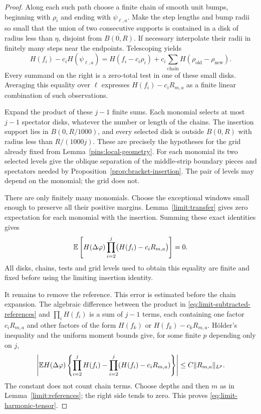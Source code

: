 \begin{proof}
Along each such path choose a finite chain of smooth unit bumps,
beginning with \(\rho_i\) and ending with \(\psi_{\ell,a}\).
Make the step lengths and bump radii so small that the union of
two consecutive supports is contained in a disk of radius less
than \(\eta\), disjoint from \(\overline{B(0,R)}\).
If necessary interpolate their radii in finitely many steps near
the endpoints.  Telescoping yields
\[
 H(f_i)-c_iH(\psi_{\ell,a})
  =H(f_i-c_i\rho_i)
    +c_i\sum_{\text{chain}}H(\rho_{\mathrm{old}}-\rho_{\mathrm{new}}).
\]
Every summand on the right is a zero-total test in one of these
small disks.  Averaging this equality over \(\ell\) expresses
\(H(f_i)-c_iR_{m,a}\) as a finite linear combination of such
observations.

Expand the product of these \(j-1\) finite sums.  Each monomial
selects at most \(j-1\) spectator disks, whatever the number or
length of the chains.  The insertion support lies in
\(B(0,R/1000)\), and every selected disk is outside \(B(0,R)\)
with radius less than \(R/(1000j)\).  These are precisely the
hypotheses for the grid already fixed from
Lemma~\ref{pins:local-geometry}.  For each monomial its two selected
levels give the oblique separation of the middle-strip boundary
pieces and spectators needed by Proposition~\ref{prop:bracket-insertion}.
The pair of levels may depend on the monomial; the grid does not.

There are only finitely many monomials.  Choose the exceptional windows
small enough to preserve all their positive margins.
Lemma~\ref{limit:transfer} gives zero expectation for each monomial
with the insertion.  Summing these exact identities gives
\begin{equation}
 \mathbb E\left[H(\Delta\varphi)
              \prod_{i=2}^j\bigl(H(f_i)-c_iR_{m,a}\bigr)\right]=0.
 \label{eq:limit-subtracted-references}
\end{equation}
All disks, chains, tests and grid levels used to obtain this equality
are finite and fixed before using the limiting insertion identity.

It remains to remove the reference.  This error is estimated before
the chain expansion.  The algebraic difference between the product
in \eqref{eq:limit-subtracted-references} and \(\prod_iH(f_i)\)
is a sum of \(j-1\) terms, each containing one factor \(c_iR_{m,a}\)
and other factors of the form \(H(f_k)\) or
\(H(f_k)-c_kR_{m,a}\).  H\"older's inequality and the uniform
moment bounds give, for some finite \(p\) depending only on \(j\),
\[
 \left|\mathbb E H(\Delta\varphi)
       \left\{\prod_{i=2}^jH(f_i)
        -\prod_{i=2}^j(H(f_i)-c_iR_{m,a})\right\}\right|
       \le C\|R_{m,a}\|_{L^p}.
\]
The constant does not count chain terms.  Choose depths and then
\(m\) as in Lemma~\ref{limit:references}; the right side tends to
zero.  This proves \eqref{eq:limit-harmonic-tensor}.


\end{proof}

